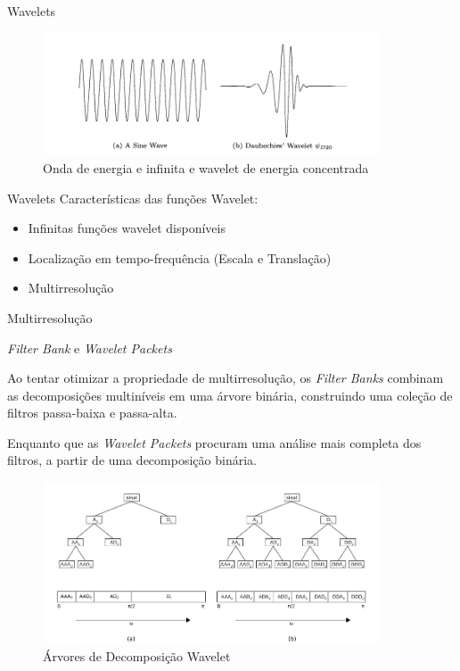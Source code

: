 \documentclass[10pt]{beamer}
\begin{document}
\begin{frame} {Wavelets}
  \begin{figure}[]
    \centering
    \includegraphics[width=10cm]{images/waveAndWavelet.png}
    \caption{Onda de energia e infinita e wavelet de energia concentrada}
  \end{figure}
\end{frame}

\begin{frame} {Wavelets}
  Características das funções Wavelet:
  \begin{itemize}
    \item Infinitas funções wavelet disponíveis
    \item Localização em tempo-frequência (Escala e Translação)
    \item Multirresolução
  \end{itemize}
\end{frame}


\begin{frame}{Multirresolução}


\end{frame}

\begin{frame}{\textit{Filter Bank} e \textit{Wavelet Packets}}

   {
    Ao tentar otimizar a propriedade de multirresolução, os \textit{Filter Banks}
    combinam as decomposições multiníveis em uma árvore binária, construindo 
    uma coleção de filtros passa-baixa e passa-alta.

    Enquanto que as \textit{Wavelet Packets} procuram uma análise mais completa 
    dos filtros, a partir de uma decomposição binária.
  }

   {
    \begin{figure}[]
      \centering
      \includegraphics[width=10cm]{images/filterBankPacket.png}
      \caption{Árvores de Decomposição Wavelet}
    \end{figure}
  }

\end{frame}
\end{document}
